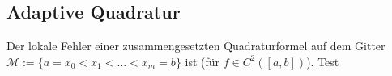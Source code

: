 \newsection
\subsection{Adaptive Quadratur}
Der lokale Fehler einer zusammengesetzten Quadraturformel auf dem Gitter $\mathcal{M} := \{ a = x_0 < x_1 < \dots < x_m = b \}$ ist (für $f \in C^2([a, b])$).
Test
